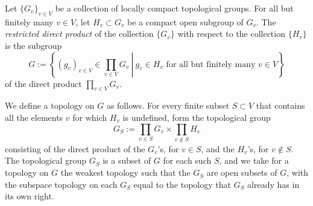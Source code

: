 \documentclass[12pt]{article}
\begin{document}
Let $\{G_v\}_{v \in V}$ be a collection of locally compact topological groups. For all but finitely many $v \in V$, let $H_v \subset G_v$ be a compact open subgroup of $G_v$. The {\em restricted direct product} of the collection $\{G_v\}$ with respect to the collection $\{H_v\}$ is the subgroup
$$
G := \left\{ \left. (g_v)_{v \in V} \in \prod_{v \in V} G_v\ \right| \ g_v \in H_v \text{  for all but finitely many $v \in V$} \right\}
$$
of the direct product $\prod_{v \in V} G_v$.

We define a topology on $G$ as follows. For every finite subset $S \subset V$ that contains all the elements $v$ for which $H_v$ is undefined, form the topological group
$$
G_S := \prod_{v \in S} G_v \times \prod_{v \notin S} H_v
$$
consisting of the direct product of the $G_v$'s, for $v \in S$, and the $H_v$'s, for $v \notin S$. The topological group $G_S$ is a subset of $G$ for each such $S$, and we take for a topology on $G$ the weakest topology such that the $G_S$ are open subsets of $G$, with the subspace topology on each $G_S$ equal to the topology that $G_S$ already has in its own right.
\end{document}
